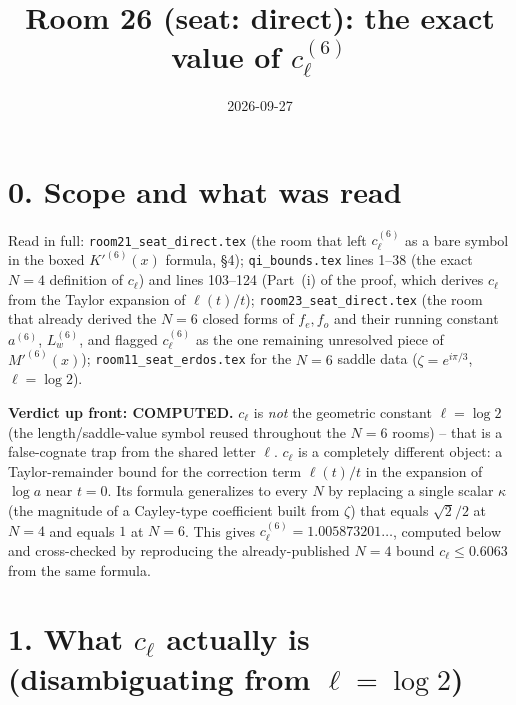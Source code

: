 \documentclass[11pt]{article}
\title{Room 26 (seat: direct): the exact value of $c_\ell^{(6)}$}
\date{2026-09-27}
\begin{document}
\maketitle

\section*{0. Scope and what was read}

Read in full: \texttt{room21\_seat\_direct.tex} (the room that left $c_\ell^{(6)}$ as a bare
symbol in the boxed $K'^{(6)}(x)$ formula, \S4); \texttt{qi\_bounds.tex} lines 1--38 (the exact
$N=4$ definition of $c_\ell$) and lines 103--124 (Part~(i) of the proof, which derives $c_\ell$
from the Taylor expansion of $\ell(t)/t$); \texttt{room23\_seat\_direct.tex} (the room that
already derived the $N=6$ closed forms of $f_e,f_o$ and their running constant $a^{(6)}$,
$L_w^{(6)}$, and flagged $c_\ell^{(6)}$ as the one remaining unresolved piece of $M'^{(6)}(x)$);
\texttt{room11\_seat\_erdos.tex} for the $N=6$ saddle data ($\zeta=e^{i\pi/3}$, $\ell=\log2$).

\textbf{Verdict up front: COMPUTED.} $c_\ell$ is \emph{not} the geometric constant $\ell=\log2$
(the length/saddle-value symbol reused throughout the $N=6$ rooms) -- that is a false-cognate
trap from the shared letter $\ell$. $c_\ell$ is a completely different object: a Taylor-remainder
bound for the correction term $\ell(t)/t$ in the expansion of $\log a$ near $t=0$. Its formula
generalizes to every $N$ by replacing a single scalar $\kappa$ (the magnitude of a Cayley-type
coefficient built from $\zeta$) that equals $\sqrt2/2$ at $N=4$ and equals $1$ at $N=6$. This
gives $c_\ell^{(6)}=1.005873201\ldots$, computed below and cross-checked by reproducing the
already-published $N=4$ bound $c_\ell\le0.6063$ from the same formula.

\section*{1. What $c_\ell$ actually is (disambiguating from $\ell=\log2$)}
\end{document}
